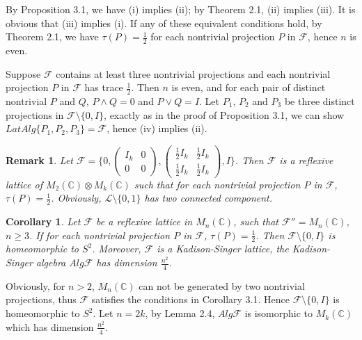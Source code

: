 \documentclass[12pt]{article}
\newtheorem{corollary}{Corollary}[section]
\newtheorem{remark}{Remark}[section]
\newcommand{\LLL}{\mathcal L} %
\newcommand{\FFF}{\mathcal F}
\newcommand{\C}{\mathbb C} %
\begin{document}
{\quad By Proposition 3.1, we have (i) implies
(ii); by Theorem 2.1, (ii) implies (iii). It is obvious that  (iii)
implies (i). If any of these equivalent conditions hold, by Theorem
2.1, we have $\tau(P)=\frac 12$ for each nontrivial projection $P$
in $\FFF$, hence $n$ is even.

Suppose $\FFF$ contains at least three nontrivial projections
and each nontrivial projection $P$ in $\FFF$ has trace $\frac 12$.
Then $n$ is even, and for each pair of distinct nontrivial $P$ and $Q$,
$P\wedge Q=0$ and $P\vee Q=I$. Let $P_1$, $P_2$ and $P_3$ be three distinct projections in $\FFF \setminus \{0, I\}$,  exactly as in the proof of Proposition 3.1, we can show $LatAlg\{P_1, P_2, P_3\} = \FFF$, hence (iv) implies (ii).

\begin{remark} Let $\FFF=\{0,\left(\begin{array}{cc} I_k & 0\\
0&0\end{array}\right), \left(\begin{array}{cc} \frac12 I_k & \frac12 I_k\\
\frac12 I_k&\frac12 I_k\end{array}\right), I\}$. Then $\FFF$ is a
reflexive lattice of $M_2(\C)\otimes M_k(\C)$ such that for each
nontrivial projection $P$ in $\FFF$, $\tau(P)=\frac 12$. Obviously,
$\LLL \setminus \{0, 1 \}$ has two connected component.
\end{remark}

\begin{corollary} Let $\FFF$ be a reflexive lattice in $M_n(\C)$, such that $\FFF'' = M_n(\C)$, $n\geq 3$. If for each nontrivial projection $P$ in $\FFF$, $\tau(P)=\frac 12$. Then
$\FFF\setminus\{0,I\}$ is homeomorphic to $S^2$. Moreover, $\FFF$ is a Kadison-Singer lattice, the Kadison-Singer algebra $Alg\FFF$ has dimension
$\frac{n^2}{4}$.
\end{corollary}

\quad Obviously, for $n >2$, $M_n(\C)$ can not be generated by
two nontrivial projections, thus $\FFF$ satisfies the
conditions in Corollary 3.1. Hence $\FFF\setminus\{0,I\}$ is
homeomorphic to $S^2$. Let
$n=2k$, by Lemma 2.4, $Alg\FFF$ is isomorphic to $M_k(\C)$ which has dimension $\frac{n^2}{4}$. 

}
\end{document}
